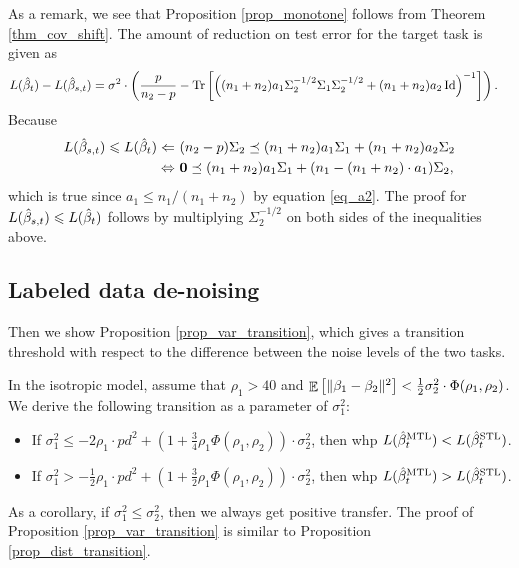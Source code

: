 As a remark, we see that Proposition \ref{prop_monotone} follows from Theorem \ref{thm_cov_shift}.
The amount of reduction on test error for the target task is given as
	\begin{align*}
		L(\hat{\beta}_t) - L(\hat{\beta}_{s,t})
		&= \sigma^2 \cdot \left({\frac p {n_2 - p} -  \operatorname{Tr}\left[\left({(n_1 + n_2)a_1\Sigma_2^{-1/2}\Sigma_1\Sigma_2^{-1/2} + (n_1 + n_2)a_2\operatorname{Id}}\right)^{-1}\right]}\right).
	\end{align*}
Because
\begin{align*}
	L(\hat{\beta}_{s,t}) \leqslant L(\hat{\beta}_t)
	\Leftarrow~ & (n_2 - p)\Sigma_2 \preceq (n_1 + n_2) a_1 \Sigma_1 + (n_1 + n_2)a_2 \Sigma_2 \\
	\Leftrightarrow~ & \mathbf{0} \preceq (n_1 + n_2) a_1 \Sigma_1 + (n_1 - (n_1 + n_2)\cdot a_1) \Sigma_2,
\end{align*}
which is true since $a_1 \le n_1 / (n_1 + n_2)$ by equation \eqref{eq_a2}.
The proof for $L(\hat{\beta}_{s,t}) \leqslant L(\hat{\beta}_t)$ follows by multiplying $\Sigma_2^{-1/2}$ on both sides of the inequalities above.

\medskip
\fi

\subsection{Labeled data de-noising}\label{app_proof_data}



Then we show Proposition \ref{prop_var_transition}, which gives a transition threshold with respect to the difference between the noise levels of the two tasks.

\begin{proposition}\label{prop_var_transition}
	In the isotropic model, assume that $\rho_1 > 40$ and $\mathop{\mathbb{E}}\left[ \|\beta_1 - \beta_2\|^2 \right]< \frac{1}{2} {\sigma_2^2}  \cdot \Phi(\rho_1, \rho_2)$.
	We derive the following transition as a parameter of $\sigma_1^2$:
	\begin{itemize}
		\item If $\sigma_1^2 \le -2 \rho_1 \cdot p d^2+\left(1+ \frac34\rho_1 \Phi(\rho_1, \rho_2)\right)\cdot\sigma_2^2$, then whp $L(\hat{\beta}_t^{\text{MTL}}) < L(\hat{\beta}_t^{\text{STL}})$.
		\item If $\sigma_1^2 > - \frac12\rho_1\cdot p d^2   +\left(1+ \frac32\rho_1\Phi(\rho_1, \rho_2)\right) \cdot \sigma_2^2$, then whp $L(\hat{\beta}_t^{\text{MTL}}) > L(\hat{\beta}_t^{\text{STL}})$.
	\end{itemize}
\end{proposition}
As a corollary, if $\sigma_1^2 \le \sigma_2^2$, then we always get positive transfer.
The proof of Proposition \ref{prop_var_transition} is similar to Proposition \ref{prop_dist_transition}.



